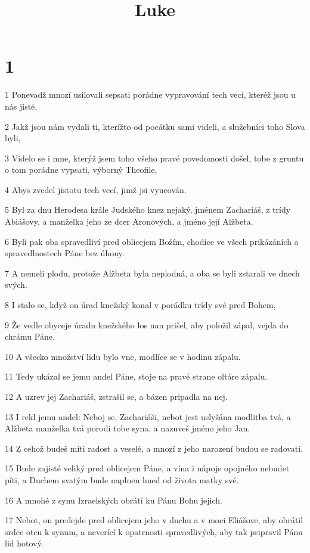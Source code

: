 

\title{Luke}

\chapter{1}

\par 1 Ponevadž mnozí usilovali sepsati porádne vypravování tech vecí, kteréž jsou u nás jisté,
\par 2 Jakž jsou nám vydali ti, kterížto od pocátku sami videli, a služebníci toho Slova byli,
\par 3 Videlo se i mne, kterýž jsem toho všeho pravé povedomosti došel, tobe z gruntu o tom porádne vypsati, výborný Theofile,
\par 4 Abys zvedel jistotu tech vecí, jimž jsi vyucován.
\par 5 Byl za dnu Herodesa krále Judského knez nejaký, jménem Zachariáš, z trídy Abiášovy, a manželka jeho ze dcer Aronových, a jméno její Alžbeta.
\par 6 Byli pak oba spravedliví pred oblicejem Božím, chodíce ve všech prikázáních a spravedlnostech Páne bez úhony.
\par 7 A nemeli plodu, protože Alžbeta byla neplodná, a oba se byli zstarali ve dnech svých.
\par 8 I stalo se, když on úrad knežský konal v porádku trídy své pred Bohem,
\par 9 Že vedle obyceje úradu knežského los nan prišel, aby položil zápal, vejda do chrámu Páne.
\par 10 A všecko množství lidu bylo vne, modlíce se v hodinu zápalu.
\par 11 Tedy ukázal se jemu andel Páne, stoje na pravé strane oltáre zápalu.
\par 12 A uzrev jej Zachariáš, zstrašil se, a bázen pripadla na nej.
\par 13 I rekl jemu andel: Neboj se, Zachariáši, nebot jest uslyšána modlitba tvá, a Alžbeta manželka tvá porodí tobe syna, a nazuveš jméno jeho Jan.
\par 14 Z cehož budeš míti radost a veselé, a mnozí z jeho narození budou se radovati.
\par 15 Bude zajisté veliký pred oblicejem Páne, a vína i nápoje opojného nebudet píti, a Duchem svatým bude naplnen hned od života matky své.
\par 16 A mnohé z synu Izraelských obrátí ku Pánu Bohu jejich.
\par 17 Nebot, on predejde pred oblicejem jeho v duchu a v moci Eliášove, aby obrátil srdce otcu k synum, a neverící k opatrnosti spravedlivých, aby tak pripravil Pánu lid hotový.

